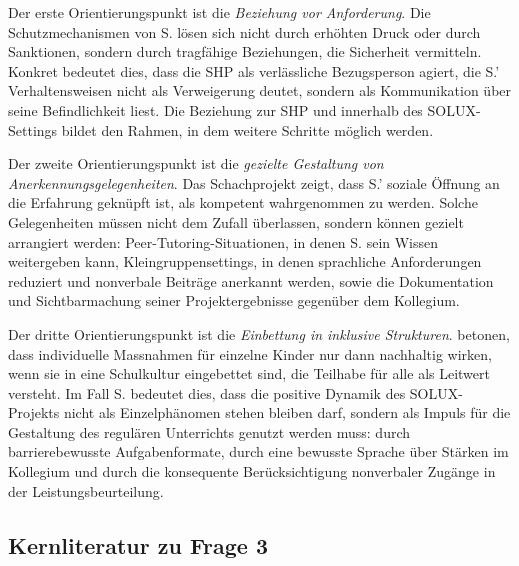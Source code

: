 \documentclass[ngerman, a4paper]{article}
\begin{document}
Der erste Orientierungspunkt ist die \textit{Beziehung vor Anforderung}. Die
Schutzmechanismen von S. lösen sich nicht durch erhöhten Druck oder durch Sanktionen,
sondern durch tragfähige Beziehungen, die Sicherheit vermitteln. Konkret bedeutet
dies, dass die SHP als verlässliche Bezugsperson agiert, die S.' Verhaltensweisen
nicht als Verweigerung deutet, sondern als Kommunikation über seine Befindlichkeit
liest. Die Beziehung zur SHP und innerhalb des SOLUX-Settings bildet den Rahmen,
in dem weitere Schritte möglich werden.

Der zweite Orientierungspunkt ist die \textit{gezielte Gestaltung von
Anerkennungsgelegenheiten}. Das Schachprojekt zeigt, dass S.' soziale Öffnung an
die Erfahrung geknüpft ist, als kompetent wahrgenommen zu werden. Solche
Gelegenheiten müssen nicht dem Zufall überlassen, sondern können gezielt arrangiert
werden: Peer-Tutoring-Situationen, in denen S. sein Wissen weitergeben kann,
Kleingruppensettings, in denen sprachliche Anforderungen reduziert und nonverbale
Beiträge anerkannt werden, sowie die Dokumentation und Sichtbarmachung seiner
Projektergebnisse gegenüber dem Kollegium.

Der dritte Orientierungspunkt ist die \textit{Einbettung in inklusive Strukturen}.
\textcite{booth2019index} betonen, dass individuelle Massnahmen für einzelne Kinder nur dann
nachhaltig wirken, wenn sie in eine Schulkultur eingebettet sind, die Teilhabe für
alle als Leitwert versteht. Im Fall S. bedeutet dies, dass die positive Dynamik des
SOLUX-Projekts nicht als Einzelphänomen stehen bleiben darf, sondern als Impuls für
die Gestaltung des regulären Unterrichts genutzt werden muss: durch barrierebewusste
Aufgabenformate, durch eine bewusste Sprache über Stärken im Kollegium und durch die
konsequente Berücksichtigung nonverbaler Zugänge in der Leistungsbeurteilung.
 
\subsection{Kernliteratur zu Frage 3}
 
\end{document}
